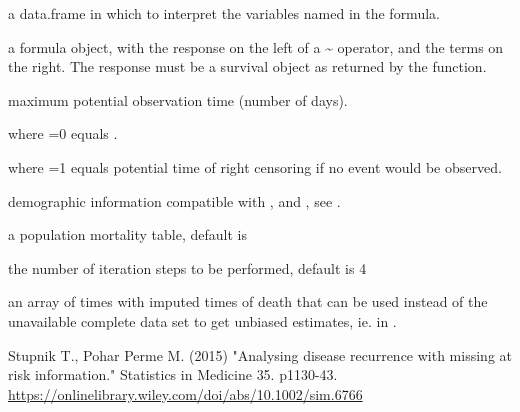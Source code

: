 \documentclass[a4paper]{book}
\begin{document}
\begin{Arguments}
\begin{ldescription}
\item[\code{data}] a data.frame in which to interpret the variables named in the
formula.

\item[\code{f}] a formula object, with the response on the left of a \textasciitilde{} operator,
and the terms on the right. The response must be a survival object as
returned by the  function.

\item[\code{maxtime}] maximum potential observation time (number of days).

where =0 equals .

where =1 equals potential time of right censoring if no event
would be observed.

\item[\code{D}] demographic information compatible with ,  
and , see .

\item[\code{ratetable}] a population mortality table, default is 

\item[\code{iterations}] the number of iteration steps to be performed, default is
4
\end{ldescription}
\end{Arguments}
%
\begin{Value}
an array of times with imputed times of death that can be used instead of the
unavailable complete data set to get unbiased estimates, ie. in .
\end{Value}
%
\begin{References}\relax
Stupnik T., Pohar Perme M. (2015) "Analysing disease recurrence
with missing at risk information." Statistics in Medicine 35. p1130-43.
\url{https://onlinelibrary.wiley.com/doi/abs/10.1002/sim.6766}
\end{References}
%
\begin{SeeAlso}\relax
{}
\end{SeeAlso}
%
\end{document}

